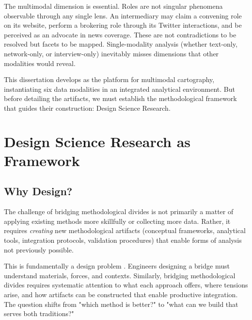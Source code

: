 \documentclass[../main.tex]{subfiles}
\begin{document}
The multimodal dimension is essential. Roles are not singular phenomena observable through any single lens. An intermediary may claim a convening role on its website, perform a brokering role through its Twitter interactions, and be perceived as an advocate in news coverage. These are not contradictions to be resolved but facets to be mapped. Single-modality analysis (whether text-only, network-only, or interview-only) inevitably misses dimensions that other modalities would reveal.

This dissertation develops \RoleBox as the platform for multimodal cartography, instantiating six data modalities in an integrated analytical environment. But before detailing the artifacts, we must establish the methodological framework that guides their construction: Design Science Research.


\section{Design Science Research as Framework}
\label{sec:intro:dsr}

\subsection{Why Design?}

The challenge of bridging methodological divides is not primarily a matter of applying existing methods more skillfully or collecting more data. Rather, it requires \emph{creating} new methodological artifacts (conceptual frameworks, analytical tools, integration protocols, validation procedures) that enable forms of analysis not previously possible.

This is fundamentally a design problem \cite{simon1996sciences}. Engineers designing a bridge must understand materials, forces, and contexts. Similarly, bridging methodological divides requires systematic attention to what each approach offers, where tensions arise, and how artifacts can be constructed that enable productive integration. The question shifts from "which method is better?" to "what can we build that serves both traditions?"
\end{document}
